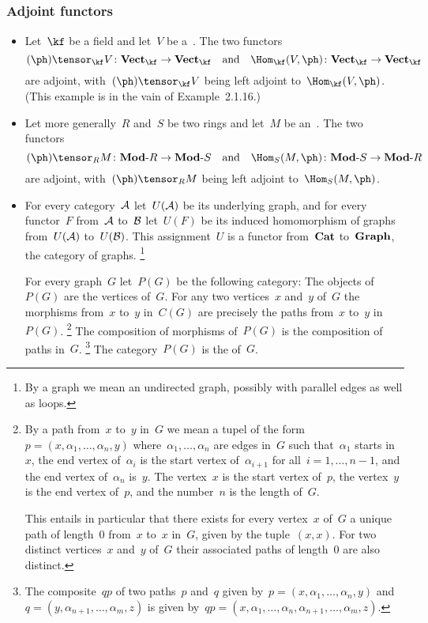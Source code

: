\subsection{}





\subsubsection*{Adjoint functors}

\begin{itemize}
	\item
		Let~$\kf$ be a field and let~$V$ be a~\vectorspace{$\kf$}.
		The two functors
		\[
			(\ph) \tensor_{\kf} V
			\colon
			\Vect{\kf} \to \Vect{\kf}
			\quad\text{and}\quad
			\Hom_{\kf}(V, \ph)
			\colon
			\Vect{\kf} \to \Vect{\kf}
		\]
		are adjoint, with~$(\ph) \tensor_{\kf} V$ being left adjoint to~$\Hom_{\kf}(V, \ph)$.
		(This example is in the vain of Example~2.1.16.)
	\item
		Let more generally~$R$ and~$S$ be two rings and let~$M$ be an~.
		The two functors
		\[
			(\ph) \tensor_R M
			\colon
			\Modr{R} \to \Modr{S}
			\quad\text{and}\quad
			\Hom_S(M, \ph)
			\colon
			\Modr{S} \to \Modr{R}
		\]
		are adjoint, with~$(\ph) \tensor_R M$ being left adjoint to~$\Hom_S(M, \ph)$.
	\item
		For every category~$\mathcal{A}$ let~$U(\mathcal{A})$ be its underlying graph, and for every functor~$F$ from~$\mathcal{A}$ to~$\mathcal{B}$ let~$U(F)$ be its induced homomorphism of graphs from~$U(\mathcal{A})$ to~$U(\mathcal{B})$.
		This assignment~$U$ is a functor from~$\mathbf{Cat}$ to~$\mathbf{Graph}$, the category of graphs.%
		\footnote{
			By a graph we mean an undirected graph, possibly with parallel edges as well as loops.
		}

		For every graph~$G$ let~$P(G)$ be the following category:
		The objects of~$P(G)$ are the vertices of~$G$.
		For any two vertices~$x$ and~$y$ of~$G$ the morphisms from~$x$ to~$y$ in~$C(G)$ are precisely the paths from~$x$ to~$y$ in~$P(G)$.%
		\footnote{
			By a path from~$x$ to~$y$ in~$G$ we mean a tupel of the form~$p = (x, α_1, \dotsc, α_n, y)$ where~$α_1, \dotsc, α_n$ are edges in~$G$ such that~$α_1$ starts in~$x$, the end vertex of~$α_i$ is the start vertex of~$α_{i+1}$ for all~$i = 1, \dotsc, n - 1$, and the end vertex of~$α_n$ is~$y$.
			The vertex~$x$ is the start vertex of~$p$, the vertex~$y$ is the end vertex of~$p$, and the number~$n$ is the length of~$G$.

			This entails in particular that there exists for every vertex~$x$ of~$G$ a unique path of length~$0$ from~$x$ to~$x$ in~$G$, given by the tuple~$(x, x)$.
			For two distinct vertices~$x$ and~$y$ of~$G$ their associated paths of length~$0$ are also distinct.
		}
		The composition of morphisms of~$P(G)$ is the composition of paths in~$G$.%
		\footnote{
			The composite~$qp$ of two paths~$p$ and~$q$ given by~$p = (x, α_1, \dotsc, α_n, y)$ and~$q = (y, α_{n+1}, \dotsc, α_m, z)$ is given by~$q p = (x, α_1, \dotsc, α_n, α_{n+1}, \dotsc, α_m, z)$.
		}
		The category~$P(G)$ is the  of~$G$.


\end{itemize}
